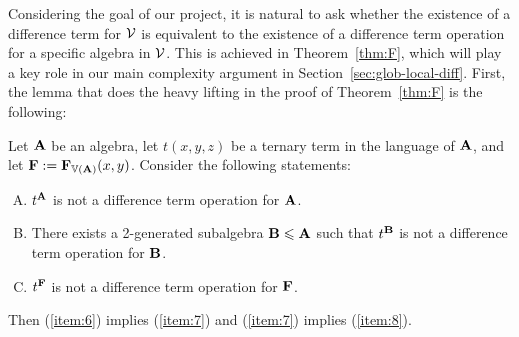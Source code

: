 Considering the goal of our project, it is natural
to ask whether the existence of a difference term for
 $\mathcal{V}$ is equivalent to the  existence  of a difference term
operation for a specific algebra in $\mathcal{V}$.  This is achieved in
Theorem~\ref{thm:F}, which will play a key role
in our main complexity argument in Section~\ref{sec:glob-local-diff}.
First, the lemma that does the heavy lifting in the proof of 
Theorem~\ref{thm:F} is the following:
\begin{lemma}
  \label{lem:equiv-cond-exist-1}
  Let $\mathbf{A}$ be an algebra, let $t(x,y,z)$ be a ternary term in the language
  of $\mathbf{A}$, and let $\mathbf{F} := \mathbf{F}_{\operatorname{\mathbb{V}}(\mathbf{A})}(x,y)$. Consider the following statements:
  \begin{enumerate}[(A)]
  \item \label{item:6} $t^{\mathbf{A}}$ is not a difference term operation for $\mathbf{A}$.
  \item \label{item:7} There exists a 2-generated subalgebra $\mathbf{B} \leqslant \mathbf{A}$
    such that $t^{\mathbf{B}}$ is not a difference term operation for $\mathbf{B}$.
  \item \label{item:8} $t^{\mathbf{F}}$ is not a difference term operation for $\mathbf{F}$.
  \end{enumerate}
  Then (\ref{item:6}) implies (\ref{item:7}) and (\ref{item:7}) implies (\ref{item:8}).
\end{lemma}
